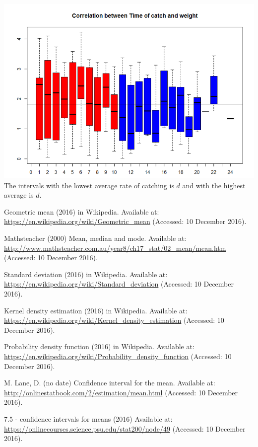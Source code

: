 \documentclass[12pt]{article} %
\begin{document}
\includegraphics[scale=.6]{correlation}
The intervals with the lowest average rate of catching is $d$ and with the highest average is $d$.

\newpage
\begin{thebibliography}{99}
 Geometric mean (2016) in Wikipedia. Available at: \url{https://en.wikipedia.org/wiki/Geometric_mean} (Accessed: 10 December 2016).

Mathsteacher (2000) Mean, median and mode. Available at: \url{http://www.mathsteacher.com.au/year8/ch17_stat/02_mean/mean.htm} (Accessed: 10 December 2016).

Standard deviation (2016) in Wikipedia. Available at: \url{https://en.wikipedia.org/wiki/Standard_deviation} (Accessed: 10 December 2016).

Kernel density estimation (2016) in Wikipedia. Available at: \url{https://en.wikipedia.org/wiki/Kernel_density_estimation} (Accessed: 10 December 2016).

Probability density function (2016) in Wikipedia. Available at: \url{https://en.wikipedia.org/wiki/Probability_density_function} (Accessed: 10 December 2016).

 M. Lane, D. (no date) Confidence interval for the mean. Available at: \url{http://onlinestatbook.com/2/estimation/mean.html} (Accessed: 10 December 2016).

7.5 - confidence intervals for means (2016) Available at: \url{https://onlinecourses.science.psu.edu/stat200/node/49} (Accessed: 10 December 2016).

\end{thebibliography}
\end{document}
